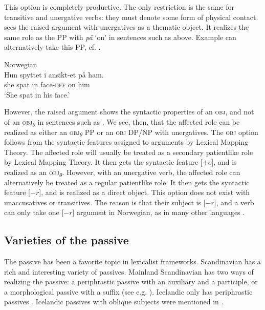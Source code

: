\documentclass[output=paper,hidelinks]{langscibook}
\begin{document}
\noindent This option is completely productive. The only restriction is the same for transitive and unergative verbs: they must denote some form of physical contact. \citet{Lodrup19b} sees the raised argument with unergatives as a thematic object. It realizes the same role as the PP with \textit{på} `on' in sentences such as  above. Example  can alternatively take this PP, cf. .



\ea\label{ex:Scandinavian:80} Norwegian \citep[563]{Lodrup19b}\\
\gll
 {Hun} {spyttet} {i} {ansikt-et} {på} {ham.}\\
 she spat in face-\textsc{def} on him\\
\glt `She spat in his face.' \z

\largerpage[-2]
\noindent However, the raised argument shows the syntactic properties of an \textsc{obj}, and not of an \textsc{obj}\textsubscript{${\theta}$} in sentences such as  \citep{Lodrup19b}. We see, then, that the affected role can be realized as either an \textsc{obj}\textsubscript{${\theta}$} PP or an \textsc{obj} DP/NP with unergatives. The \textsc{obj} option follows from the syntactic features assigned to arguments by Lexical Mapping Theory. The affected role will usually be treated as a secondary patientlike role by Lexical Mapping Theory. It then gets the syntactic feature [$+o$], and is realized as an \textsc{obj}\textsubscript{${\theta}$}. However, with an unergative verb, the affected role can alternatively be treated as a regular patientlike role. It then gets the syntactic feature [$-r$], and is realized as a direct object. This option does not exist with unaccusatives or transitives. The reason is that their subject is [$-r$], and a verb can only take one [$-r$] argument in Norwegian, as in many other languages \citep{BresMosh90}.

\subsection{Varieties of the passive}
\label{sec:Scandinavian:3.8}

The passive has been a favorite topic in lexicalist frameworks. Scandinavian has a rich and interesting variety of passives. Mainland Scandinavian has two ways of realizing the passive: a periphrastic passive with an auxiliary and a participle, or a morphological passive with a suffix (see e.g. \citealt{Engdahl06}). Icelandic only has periphrastic passives \citep[10--11]{Thrainsson07}. Icelandic passives with oblique subjects were mentioned in .
\end{document}
